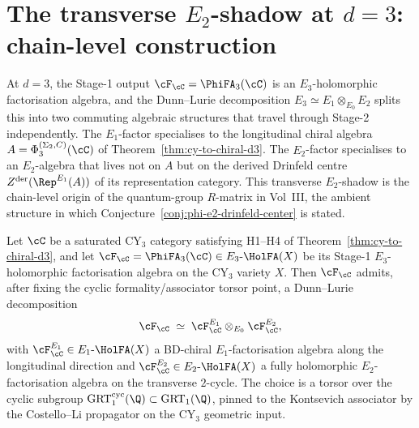 \section{The transverse \texorpdfstring{$E_2$}{E-2}-shadow at \texorpdfstring{$d = 3$}{d=3}: chain-level construction}
\label{sec:e2-transverse-shadow-d3}

At $d = 3$, the Stage-1 output $\cF_\cC = \PhiFA_3(\cC)$ is an
$E_3$-holomorphic factorisation algebra, and the Dunn--Lurie
decomposition $E_3 \simeq E_1 \otimes_{E_0} E_2$ splits this into two
commuting algebraic structures that travel through Stage-2
independently. The $E_1$-factor specialises to the longitudinal
chiral algebra $A = \Phi_3^{(\Sigma_2, C)}(\cC)$ of
Theorem~\ref{thm:cy-to-chiral-d3}. The $E_2$-factor specialises to an
$E_2$-algebra that lives not on $A$ but on the derived Drinfeld centre
$Z^{\mathrm{der}}(\Rep^{E_1}(A))$ of its representation category. This
transverse $E_2$-shadow is the chain-level origin of the quantum-group
$R$-matrix in Vol~III, the ambient structure in which
Conjecture~\ref{conj:phi-e2-drinfeld-center} is stated.

\begin{theorem}
\label{thm:dunn-lurie-phi-fa-3}
Let $\cC$ be a saturated CY$_3$ category satisfying H1--H4 of
Theorem~\ref{thm:cy-to-chiral-d3}, and let $\cF_\cC = \PhiFA_3(\cC)
\in E_3\text{-}\HolFA(X)$ be its Stage-1 $E_3$-holomorphic factorisation
algebra on the CY$_3$ variety $X$. Then $\cF_\cC$ admits, after fixing
the cyclic formality/associator torsor point, a Dunn--Lurie
decomposition
\[
 \cF_\cC \;\simeq\; \cF^{E_1}_\cC \otimes_{E_0} \cF^{E_2}_\cC,
\]
with $\cF^{E_1}_\cC \in E_1\text{-}\HolFA(X)$ a BD-chiral
$E_1$-factorisation algebra along the longitudinal direction and
$\cF^{E_2}_\cC \in E_2\text{-}\HolFA(X)$ a fully holomorphic
$E_2$-factorisation algebra on the transverse $2$-cycle. The
choice is a torsor over the cyclic subgroup
$\mathrm{GRT}_1^{\mathrm{cyc}}(\Q) \subset \mathrm{GRT}_1(\Q)$, pinned
to the Kontsevich associator by the Costello--Li propagator on the
CY$_3$ geometric input.
\end{theorem}

